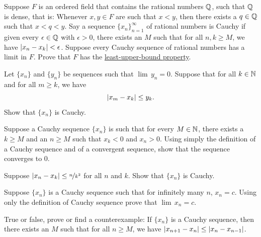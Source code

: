 \begin{exercise}[Challenging]
Suppose $F$ is an ordered field that contains the rational numbers
${\mathbb{Q}}$, such that ${\mathbb{Q}}$ is dense,
that is: Whenever $x,y \in F$ are such that $x < y$,
then there exists a $q \in {\mathbb{Q}}$ such that $x < q < y$.
Say a sequence $\{ x_n \}_{n=1}^\infty$ of rational numbers is Cauchy
if given every $\epsilon \in {\mathbb{Q}}$ with $\epsilon > 0$, there exists
an $M$ such that for all $n,k \geq M$, we have $\left\lvert {x_n-x_k} \right\rvert < \epsilon$.
Suppose every Cauchy sequence of rational numbers has a limit in $F$.
Prove that $F$ has the \hyperref[defn:lub]{least-upper-bound property}.
\end{exercise}

\begin{exercise}
Let $\{ x_n \}$ and $\{ y_n \}$ be sequences such
that $\lim\, y_n =0$.  Suppose that for all $k \in {\mathbb{N}}$
and
for all $m \geq k$, we have
\begin{equation*}
\left\lvert {x_m-x_k} \right\rvert \leq y_k .
\end{equation*}
Show that $\{ x_n \}$ is Cauchy.
\end{exercise}

\begin{exercise}
Suppose a Cauchy sequence $\{ x_n \}$ is such that for every $M \in {\mathbb{N}}$,
there exists a $k \geq M$ and an $n \geq M$ such that
$x_k < 0$ and $x_n > 0$.  Using simply the definition of a Cauchy sequence
and of a convergent sequence, show that
the sequence converges to $0$.
\end{exercise}

\begin{exercise}
Suppose $\left\lvert {x_n-x_k} \right\rvert \leq \nicefrac{n}{k^2}$ for all $n$ and $k$.
Show that $\{ x_n \}$ is Cauchy.
\end{exercise}

\begin{exercise}
Suppose $\{ x_n \}$ is a Cauchy sequence such that for infinitely many
$n$, $x_n = c$.  Using only the definition of Cauchy sequence prove 
that $\lim\, x_n = c$.
\end{exercise}

\begin{exercise}
True or false, prove or find a counterexample:  If $\{ x_n \}$ is a Cauchy
sequence, then there exists an $M$
such that for all $n \geq M$, we have
$\left\lvert {x_{n+1}-x_n} \right\rvert
\leq
\left\lvert {x_{n}-x_{n-1}} \right\rvert$.
\end{exercise}



